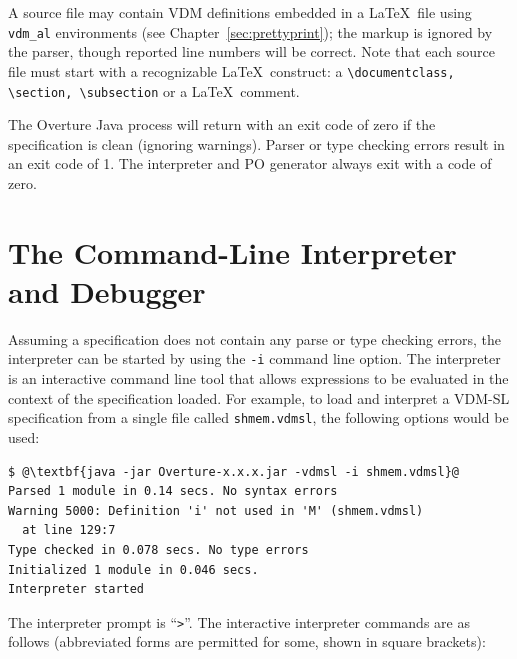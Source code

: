 \documentclass{overturerepchap}
\begin{document}
A source file may contain VDM definitions embedded
in a \LaTeX\ file using \verb|vdm_al| environments (see
Chapter~\ref{sec:prettyprint}); the markup is ignored by the parser,
though reported line numbers will be correct. Note that each source file
must start with a recognizable \LaTeX\ construct:
a \verb+\documentclass, \section, \subsection+ or a \LaTeX\ comment.

The Overture Java process will return with an exit code of zero if the
specification is clean (ignoring warnings). Parser or type checking
errors result in an exit code of 1. The interpreter and PO generator
always exit with a code of zero.

\section{The Command-Line Interpreter and Debugger}\label{sec:commandlineinterpreter}

Assuming a specification does not contain any parse or type checking errors, the interpreter can be
started by using the \texttt{-i} command line option.
The interpreter is an interactive command line tool that allows expressions to be evaluated in the
context of the specification loaded. For example, to load and interpret a
VDM-SL specification from a single file called \texttt{shmem.vdmsl},
the following options would be used:

\begin{lstlisting}[escapechar=@]
$ @\textbf{java -jar Overture-x.x.x.jar -vdmsl -i shmem.vdmsl}@
Parsed 1 module in 0.14 secs. No syntax errors
Warning 5000: Definition 'i' not used in 'M' (shmem.vdmsl) 
  at line 129:7
Type checked in 0.078 secs. No type errors
Initialized 1 module in 0.046 secs.
Interpreter started
\end{lstlisting}

The interpreter prompt is ``\texttt{>}''. The
interactive interpreter commands are as follows (abbreviated forms are
permitted for some, shown in square brackets):
\end{document}
